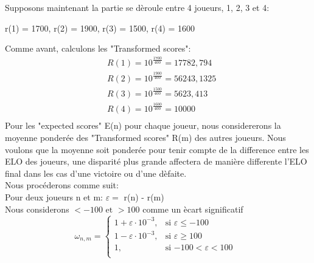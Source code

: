 \documentclass[11pt,a4paper,titlepage]{article}
\begin{document}
    Supposons maintenant la partie se dèroule entre 4 joueurs, 1, 2, 3 et 4:
    \begin{center}
        r(1) = 1700, r(2) = 1900, r(3) = 1500, r(4) = 1600
    \end{center}
    Comme avant, calculons les "Transformed scores":
        \begin{equation}
            \begin{split}
                & R(1) = 10^{\frac{1700}{400}} = 17782,794 \\
                & R(2) = 10^{\frac{1900}{400}} = 56243,1325 \\
                & R(3) = 10^{\frac{1500}{400}} = 5623, 413  \\
                & R(4) = 10^{\frac{1600}{400}} = 10000 \\
            \end{split}
        \end{equation}
        Pour les "expected scores" E(n) pour chaque joueur, nous considererons la moyenne ponderée des "Transformed scores" R(m) des autres joueurs. 
        Nous voulons que la moyenne soit ponderée pour tenir compte de la difference entre les ELO des joueurs, une disparité plus grande affectera 
        de manière differente l'ELO final dans les cas d'une victoire ou d'une dèfaite.  \\
        Nous procéderons comme suit: \\
        Pour deux joueurs n et m: $\varepsilon = $ r(n) - r(m)  \\
        Nous considerons $< -100 \text{ et } > 100$ comme un ècart significatif
            $$ \omega_{n, m} =
            \begin{cases}
                1 + \varepsilon \cdot 10^{-3}, & \text{si $\varepsilon \le -100$} \\
                1 - \varepsilon \cdot 10^{-3}, & \text{si $\varepsilon \ge 100$} \\
                1, & \text{si $-100 < \varepsilon < 100$ }\\
            \end{cases} $$
        
\end{document}
